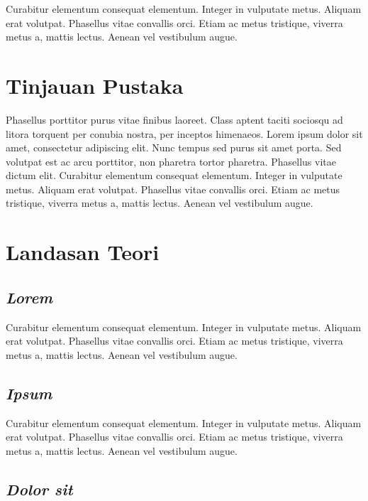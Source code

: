 

Curabitur elementum consequat elementum. Integer in vulputate
metus. Aliquam erat volutpat. Phasellus vitae convallis orci. Etiam ac
metus tristique, viverra metus a, mattis lectus. Aenean vel vestibulum
augue.

\section{Tinjauan Pustaka}

Phasellus porttitor purus \textcite{warn} vitae finibus laoreet. Class
aptent taciti sociosqu ad litora torquent per conubia nostra, per
inceptos himenaeos. Lorem ipsum dolor sit amet, consectetur adipiscing
elit. Nunc tempus sed purus sit amet porta. Sed volutpat est ac arcu
porttitor, non pharetra tortor pharetra. Phasellus vitae dictum
elit. Curabitur elementum consequat elementum. Integer in vulputate
metus. Aliquam erat volutpat. Phasellus vitae convallis orci. Etiam ac
metus tristique, viverra metus a, mattis lectus. Aenean vel vestibulum
augue.

\section{Landasan Teori}

\subsection{\emph{Lorem}}

Curabitur elementum consequat elementum. Integer in vulputate
metus. Aliquam erat volutpat. Phasellus vitae convallis orci. Etiam ac
metus tristique, viverra metus a, mattis lectus. Aenean vel vestibulum
augue.

\subsection{\emph{Ipsum}}

Curabitur elementum consequat elementum. Integer in vulputate
metus. Aliquam erat volutpat. Phasellus vitae convallis orci. Etiam ac
metus tristique, viverra metus a, mattis lectus. Aenean vel vestibulum
augue.

\subsection{\emph{Dolor sit}}

